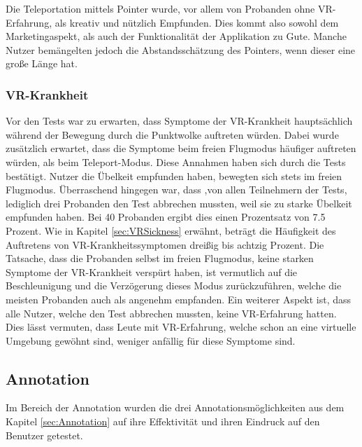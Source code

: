 Die Teleportation mittels Pointer wurde, vor allem von Probanden ohne VR-Erfahrung, als kreativ und nützlich Empfunden. Dies kommt also sowohl dem Marketingaspekt, als auch der Funktionalität der Applikation zu Gute. Manche Nutzer bemängelten jedoch die Abstandsschätzung des Pointers, wenn dieser eine große Länge hat.


\subsubsection{VR-Krankheit}

Vor den Tests war zu erwarten, dass Symptome der VR-Krankheit hauptsächlich während der Bewegung durch die Punktwolke auftreten würden. Dabei wurde zusätzlich erwartet, dass die Symptome beim freien Flugmodus häufiger auftreten würden, als beim Teleport-Modus. Diese Annahmen haben sich durch die Tests bestätigt. Nutzer die Übelkeit empfunden haben, bewegten sich stets im freien Flugmodus. Überraschend hingegen war, dass ,von allen Teilnehmern der Tests, lediglich drei Probanden den Test abbrechen mussten, weil sie zu starke Übelkeit empfunden haben. Bei 40 Probanden ergibt dies einen Prozentsatz von 7.5 Prozent. Wie in Kapitel \ref{sec:VRSickness} erwähnt, beträgt die Häufigkeit des Auftretens von VR-Krankheitssymptomen dreißig bis achtzig Prozent. Die Tatsache, dass die Probanden selbst im freien Flugmodus, keine starken Symptome der VR-Krankheit verspürt haben, ist vermutlich auf die Beschleunigung und die Verzögerung dieses Modus zurückzuführen, welche die meisten Probanden auch als angenehm empfanden. Ein weiterer Aspekt ist, dass alle Nutzer, welche den Test abbrechen mussten, keine VR-Erfahrung hatten. Dies lässt vermuten, dass Leute mit VR-Erfahrung, welche schon an eine virtuelle Umgebung gewöhnt sind, weniger anfällig für diese Symptome sind.

\subsection{Annotation}
Im Bereich der Annotation wurden die drei Annotationsmöglichkeiten aus dem Kapitel \ref{sec:Annotation} auf ihre Effektivität und ihren Eindruck auf den Benutzer getestet.

